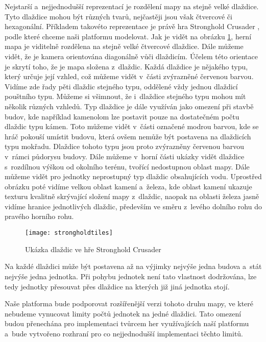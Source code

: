 Nejstarší a~nejjednodušší reprezentací je rozdělení mapy na stejně velké dlaždice. Tyto dlaždice mohou být různých tvarů, nejčastěji jsou však čtvercové či hexagonální. Příkladem takovéto reprezentace je právě hra Stronghold Crusader \citep{site:strongholdcrus}, podle které chceme naši platformu modelovat. Jak je vidět na obrázku  \ref{fig:tiletype}, herní mapa je viditelně rozdělena na stejně velké čtvercové dlaždice. Dále můžeme vidět, že je kamera orientována diagonálně vůči dlaždicím. Účelem této orientace je skrytí toho, že je mapa složena z~dlaždic. Každá dlaždice je nějakého typu, který určuje její vzhled, což můžeme vidět v~části zvýrazněné červenou barvou. Vidíme zde řady pěti dlaždic stejného typu, oddělené vždy jednou dlaždicí pouštního typu. Můžeme si všimnout, že i~dlaždice stejného typu mohou mít několik různých vzhledů. Typ dlaždice je dále využíván jako omezení při stavbě budov, kde například kamenolom lze postavit pouze na dostatečném počtu dlaždic typu kámen. Toto můžeme vidět v~části označené modrou barvou, kde se hráč pokouší umístit budovu, která ovšem nemůže být postavena na dlaždicích typu mokřadu. Dlaždice tohoto typu jsou proto zvýrazněny červenou barvou v~rámci půdorysu budovy. Dále můžeme v~horní části ukázky vidět dlaždice s~rozdílnou výškou od okolního terénu, tvořící nedostupnou oblast mapy. Dále můžeme vidět pro jednotky neprostupný typ dlaždic obsahujících vodu. Uprostřed obrázku poté vidíme velkou oblast kamení a~železa, kde oblast kamení ukazuje texturu kvalitně skrývající složení mapy z~dlaždic, naopak na oblasti železa jasně vidíme hranice jednotlivých dlaždic, především ve směru z~levého dolního rohu do pravého horního rohu.

\begin{figure}[h]
	\centering
	\texttt{[image: strongholdtiles]}
	\caption{Ukázka dlaždic ve hře Stronghold Crusader}
	\label{fig:tiletype}
\end{figure}

Na každé dlaždici může být postavena až na výjimky nejvýše jedna budova a~stát nejvýše jedna jednotka. Při pohybu jednotek není tato vlastnost dodržována, lze tedy jednotky přesouvat přes dlaždice na kterých již jiná jednotka stojí. 

Naše platforma bude podporovat rozšířenější verzi tohoto druhu mapy, ve které nebudeme vynucovat limity počtů jednotek na jedné dlaždici. Tato omezení budou přenechána pro implementaci tvůrcem her využívajících naší platformu a~bude vytvořeno rozhraní pro co nejjednodušší implementaci těchto limitů. 

